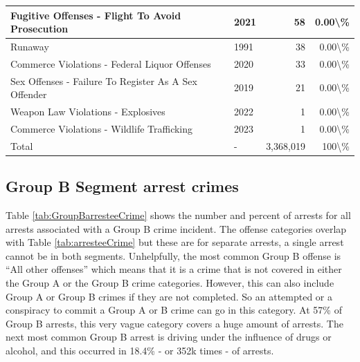 \documentclass[
]{krantz}
\begin{document}
\begin{longtable}[t]{l|l|r|r}
\hline
Fugitive Offenses - Flight To Avoid Prosecution & 2021 & 58 & 0.00\textbackslash{}\%\\
\hline
Runaway & 1991 & 38 & 0.00\textbackslash{}\%\\
\hline
Commerce Violations - Federal Liquor Offenses & 2020 & 33 & 0.00\textbackslash{}\%\\
\hline
Sex Offenses - Failure To Register As A Sex Offender & 2019 & 21 & 0.00\textbackslash{}\%\\
\hline
Weapon Law Violations - Explosives & 2022 & 1 & 0.00\textbackslash{}\%\\
\hline
Commerce Violations - Wildlife Trafficking & 2023 & 1 & 0.00\textbackslash{}\%\\
\hline
Total & - & 3,368,019 & 100\textbackslash{}\%\\
\hline
\end{longtable}

\subsection{Group B Segment arrest
crimes}\label{group-b-segment-arrest-crimes}

Table \ref{tab:GroupBarresteeCrime} shows the number and
percent of arrests for all arrests associated with a Group B
crime incident. The offense categories overlap with Table
\ref{tab:arresteeCrime} but these are for separate arrests,
a single arrest cannot be in both segments. Unhelpfully, the
most common Group B offense is ``All other offenses'' which
means that it is a crime that is not covered in either the
Group A or the Group B crime categories. However, this can
also include Group A or Group B crimes if they are not
completed. So an attempted or a conspiracy to commit a Group
A or B crime can go in this category. At 57\% of Group B
arrests, this very vague category covers a huge amount of
arrests. The next most common Group B arrest is driving
under the influence of drugs or alcohol, and this occurred
in 18.4\% - or 352k times - of arrests.
\end{document}
